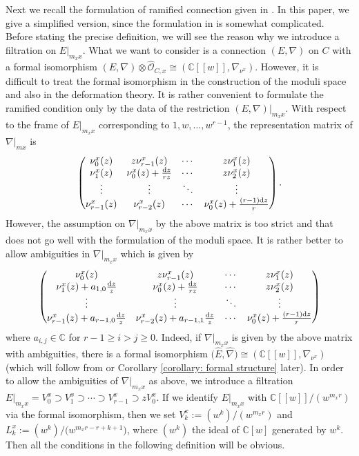 \documentclass[pdftex]{sigma}
\numberwithin{equation}{section}
\begin{document}
Next we recall the formulation of ramified connection given in \cite{Inaba-2}.
In this paper, we give a simplified version,
since the formulation in \cite{Inaba-2} is somewhat complicated.
Before stating the precise definition,
we will see the reason why we introduce a filtration on $E|_{m_xx}$.
What we want to consider is a connection $(E,\nabla)$ on $C$ with a formal isomorphism
$(E,\nabla)\otimes\widehat{\mathcal O}_{C,x}\cong(\mathbb{C}[[w]],\nabla_{\nu^x})$.
However, it is difficult to treat the formal isomorphism
in the construction of the moduli space
and also in the deformation theory.
It is rather convenient to formulate the ramified condition
only by the data of the restriction
$(E,\nabla)|_{m_xx}$.
With respect to the frame of $E|_{m_xx}$
corresponding to $1,w,\dots,w^{r-1}$,
the representation matrix of $\nabla|_{mx}$ is
\[
 \begin{pmatrix}
 \nu_0^x(z) & z\nu_{r-1}^x(z) & \cdots & z\nu_1^x(z) \\
 \nu_1^x(z) & \nu_0^x(z)+\frac{{\rm d}z}{rz} & \cdots & z\nu_2^x(z) \\
 \vdots & \vdots & \ddots & \vdots \\
 \nu_{r-1}^x(z) & \nu_{r-2}^x(z) & \cdots & \nu_0^x(z)+\frac{(r-1){\rm d}z}{r}
 \end{pmatrix}.
\]
However, the assumption on $\nabla|_{m_xx}$ by the above matrix is too strict
and that does not go well with the formulation of the moduli space.
It is rather better to allow ambiguities in $\nabla|_{m_xx}$
which is given by
\begin{equation}
\label{equation: representation matrix with ambiguity}
 \begin{pmatrix}
 \nu_0^x(z) & z\nu_{r-1}^x(z) & \cdots & z\nu_1^x(z) \\
 \nu_1^x(z)+a_{1,0}\frac{{\rm d}z}{z} & \nu_0^x(z)+\frac{{\rm d}z}{rz} & \cdots & z\nu_2^x(z) \\
 \vdots & \vdots & \ddots & \vdots \\
 \nu_{r-1}^x(z)+a_{r-1,0}\frac{{\rm d}z}{z} & \nu_{r-2}^x(z)+a_{r-1,1}\frac{{\rm d}z}{z}
 & \cdots & \nu_0^x(z)+\frac{(r-1){\rm d}z}{r}
 \end{pmatrix}
\end{equation}
where $a_{i,j}\in\mathbb{C}$ for $r-1\geq i>j\geq 0$.
Indeed, if $\nabla|_{m_xx}$ is given by the above matrix with ambiguities,
there is a formal isomorphism
$\big(\widehat{E},\widehat{\nabla}\big)\cong(\mathbb{C}[[w]],\nabla_{\nu^x})$
(which will follow from \cite[Proposition 1.3]{Inaba-2} or
Corollary \ref{corollary: formal structure} later).
In order to allow the ambiguities of $\nabla|_{m_xx}$ as above,
we introduce a filtration
$E|_{m_xx}=V^x_0\supset V^x_1\supset\cdots\supset V^x_{r-1}\supset z V^x_0$.
If we identify $E|_{m_xx}$ with $\mathbb{C}[[w]]/(w^{m_xr})$
via the formal isomorphism,
then we set $V^x_k:=(w^k)/(w^{m_xr})$
and $L_k^x:=(w^k)/\big(w^{m_xr-r+k+1}\big)$,
where $(w^k)$ the ideal of $\mathbb{C}[w]$ generated by
$w^k$.
Then all the conditions in the following definition will be obvious.
\end{document}
